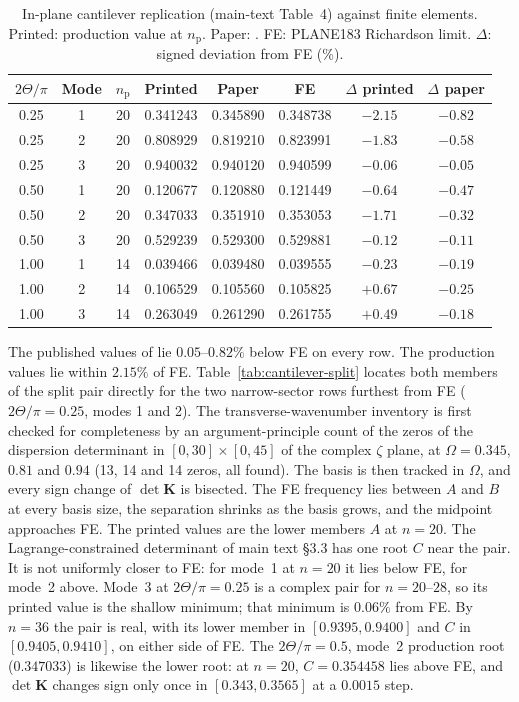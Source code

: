 \documentclass[11pt]{article}
\begin{document}
\begin{table}[!htbp]\centering\scriptsize
\setlength{\tabcolsep}{4pt}
\caption{In-plane cantilever replication (main-text Table~4) against
finite elements. Printed: production value at $n_{\mathrm p}$. Paper:
\cite{seok2}. FE: PLANE183 Richardson limit. $\Delta$: signed
deviation from FE (\%).}
\label{tab:cantilever-ip-fe}
\begin{tabular}{cccccccc}
\toprule $2\Theta/\pi$ & Mode & $n_{\mathrm{p}}$ & Printed & Paper & FE & $\Delta$ printed & $\Delta$ paper\\ \midrule
0.25 & 1 & 20 & 0.341243 & 0.345890 & 0.348738 & $-2.15$ & $-0.82$\\
0.25 & 2 & 20 & 0.808929 & 0.819210 & 0.823991 & $-1.83$ & $-0.58$\\
0.25 & 3 & 20 & 0.940032 & 0.940120 & 0.940599 & $-0.06$ & $-0.05$\\
0.50 & 1 & 20 & 0.120677 & 0.120880 & 0.121449 & $-0.64$ & $-0.47$\\
0.50 & 2 & 20 & 0.347033 & 0.351910 & 0.353053 & $-1.71$ & $-0.32$\\
0.50 & 3 & 20 & 0.529239 & 0.529300 & 0.529881 & $-0.12$ & $-0.11$\\
1.00 & 1 & 14 & 0.039466 & 0.039480 & 0.039555 & $-0.23$ & $-0.19$\\
1.00 & 2 & 14 & 0.106529 & 0.105560 & 0.105825 & $+0.67$ & $-0.25$\\
1.00 & 3 & 14 & 0.263049 & 0.261290 & 0.261755 & $+0.49$ & $-0.18$\\
\bottomrule
\end{tabular}
\end{table}

The published values of \cite{seok2} lie $0.05$--$0.82\%$ below FE on
every row. The production values lie within $2.15\%$ of FE. Table~\ref{tab:cantilever-split}
locates both members of the split pair directly for the two
narrow-sector rows furthest from FE ($2\Theta/\pi=0.25$, modes 1 and
2). The transverse-wavenumber inventory is first checked for
completeness by an argument-principle count of the zeros of the
dispersion determinant in $[0,30]\times[0,45]$ of the complex $\zeta$
plane, at $\Omega=0.345$, $0.81$ and $0.94$ (13, 14 and 14 zeros, all
found). The basis is then tracked in $\Omega$, and every sign change of
$\det\mathbf K$ is bisected. The FE
frequency lies between $A$ and $B$ at every basis size, the separation
shrinks as the basis grows, and the midpoint approaches FE. The printed
values are the lower members $A$ at $n=20$. The Lagrange-constrained
determinant of main text \S3.3 has one root $C$ near the pair. It is not
uniformly closer to FE: for mode~1 at $n=20$ it lies below FE, for
mode~2 above. Mode~3 at $2\Theta/\pi=0.25$ is a complex pair for
$n=20$--$28$, so its printed value is the shallow minimum; that minimum
is $0.06\%$ from FE. By $n=36$ the pair is real, with its lower member
in $[0.9395,0.9400]$ and $C$ in $[0.9405,0.9410]$, on either side of
FE. The $2\Theta/\pi=0.5$, mode~2 production root ($0.347033$) is
likewise the lower root: at $n=20$, $C=0.354458$ lies above FE, and
$\det\mathbf K$ changes sign only once in $[0.343,0.3565]$ at a
$0.0015$ step.
\end{document}
